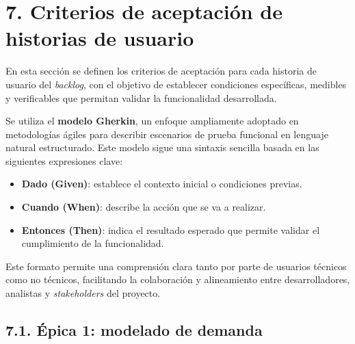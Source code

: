 \documentclass[
11pt, %
]{charter}
\begin{document}
\section{7. Criterios de aceptación de historias de usuario}
\label{sec:criteriosAceptacion}

En esta sección se definen los criterios de aceptación para cada historia de usuario del \textit{backlog}, con el objetivo de establecer condiciones específicas, medibles y verificables que permitan validar la funcionalidad desarrollada. 

Se utiliza el \textbf{modelo Gherkin}, un enfoque ampliamente adoptado en metodologías ágiles para describir escenarios de prueba funcional en lenguaje natural estructurado. Este modelo sigue una sintaxis sencilla basada en las siguientes expresiones clave:

\begin{itemize}
  \item \textbf{Dado (Given)}: establece el contexto inicial o condiciones previas.
  \item \textbf{Cuando (When)}: describe la acción que se va a realizar.
  \item \textbf{Entonces (Then)}: indica el resultado esperado que permite validar el cumplimiento de la funcionalidad.
\end{itemize}

Este formato permite una comprensión clara tanto por parte de usuarios técnicos como no técnicos, facilitando la colaboración y alineamiento entre desarrolladores, analistas y \textit{stakeholders} del proyecto.

\subsection*{7.1. Épica 1: modelado de demanda}
\end{document}
